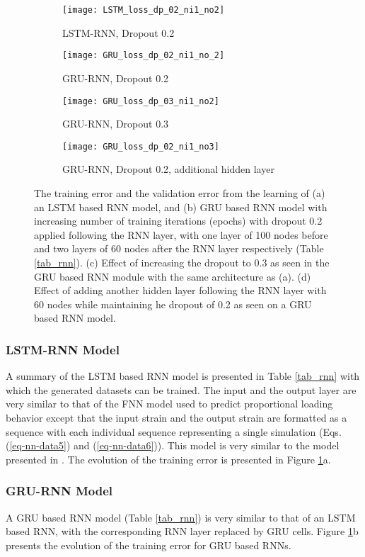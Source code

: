 \begin{figure}[]
	\centering
	\begin{subfigure}[t]{0.49\textwidth}
		\texttt{[image: LSTM\_loss\_dp\_02\_ni1\_no2]}
		\caption{LSTM-RNN, Dropout 0.2}
	\end{subfigure}
	\begin{subfigure}[t]{0.49\textwidth}
		\texttt{[image: GRU\_loss\_dp\_02\_ni1\_no\_2]}
		\caption{GRU-RNN, Dropout 0.2}
	\end{subfigure}
	\begin{subfigure}[t]{0.49\textwidth}
		\texttt{[image: GRU\_loss\_dp\_03\_ni1\_no2]}
		\caption{GRU-RNN, Dropout 0.3}
	\end{subfigure}
	\begin{subfigure}[t]{0.49\textwidth}
		\texttt{[image: GRU\_loss\_dp\_02\_ni1\_no3]}
		\caption{GRU-RNN, Dropout 0.2, additional hidden layer}
	\end{subfigure}
	\caption{The training error and the validation error from the learning of (a) an LSTM based RNN model, and (b) GRU based RNN model with increasing number of training iterations (epochs) with dropout 0.2 applied following the RNN layer, with one layer of 100 nodes before and two layers of 60 nodes after the RNN layer respectively (Table \ref{tab_rnn}). (c) Effect of increasing the dropout to 0.3 as seen in the GRU based RNN module with the same architecture as (a). (d) Effect of adding another hidden layer following the RNN layer with 60 nodes while maintaining he dropout of 0.2 as seen on a GRU based RNN model.}\label{fig-nn-rnn1}
\end{figure}

\subsubsection{LSTM-RNN Model}
A summary of the LSTM based RNN model is presented in Table \ref{tab_rnn} with which the generated datasets can be trained. The input and the output layer are very similar to that of the FNN model used to predict proportional loading behavior except that the input strain and the output strain are formatted as a sequence with each individual sequence representing a single simulation (Eqs. (\ref{eq-nn-data5}) and (\ref{eq-nn-data6})). This model is very similar to the model presented in \cite{wuRecurrentNeuralNetworkaccelerated2020}. The evolution of the training error is presented in Figure \ref{fig-nn-rnn1}a.


\subsubsection{GRU-RNN Model} A GRU based RNN model (Table \ref{tab_rnn}) is very similar to that of an LSTM based RNN, with the corresponding RNN layer replaced by GRU cells. Figure \ref{fig-nn-rnn1}b presents the evolution of the training error for GRU based RNNs. 

